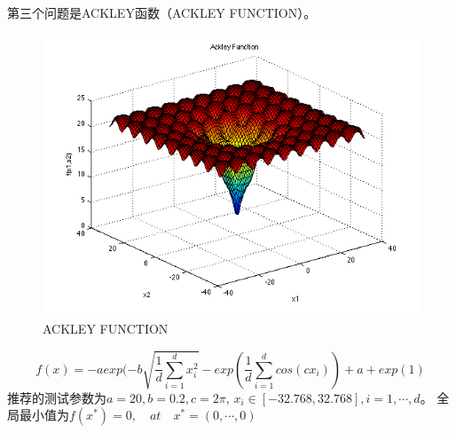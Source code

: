 \documentclass[]{ctexbook}
\begin{document}
第三个问题是ACKLEY函数（ACKLEY FUNCTION）。

\begin{figure}

{\centering \includegraphics[width=0.7\linewidth]{img/python3} 

}

\caption{ACKLEY FUNCTION}\label{fig:python3}
\end{figure}

\[
f(x) = -aexp(-b\sqrt{\frac{1}{d}\sum_{i=1}^dx_i^2}-exp(\frac{1}{d}\sum_{i=1}^{d}cos(cx_i))+a+exp(1)
\] 推荐的测试参数为\(a=20,b=0.2,c=2\pi\),
\(x_i\in[-32.768,32.768],i=1,\cdots,d\)。
全局最小值为\(f(x^*)=0,\quad at\quad x^* = (0,\cdots,0)\)
\end{document}
